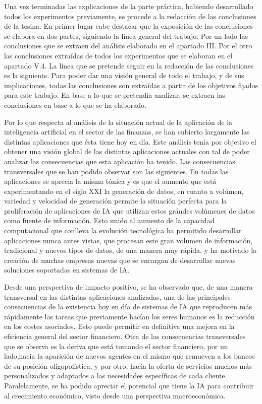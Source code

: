 \documentclass[]{DissertateUSU}
\begin{document}
\noindent Una vez terminadas las explicaciones de la parte práctica,
habiendo desarrollado todos los experimentos previamente, se procede a
la redacción de las conclusiones de la tesina. En primer lugar cabe
destacar que la exposición de las conclusiones se elabora en dos partes,
siguiendo la línea general del trabajo. Por un lado las conclusiones que
se extraen del análisis elaborado en el apartado III. Por el otro las
conclusiones extraídas de todos los experimentos que se elaboran en el
apartado V.4. La línea que se pretende seguir en la redacción de las
conclusiones es la siguiente. Para poder dar una visión general de todo
el trabajo, y de sus implicaciones, todas las conclusiones son extraídas
a partir de los objetivos fijados para este trabajo. En base a lo que se
pretendía analizar, se extraen las conclusiones en base a lo que se ha
elaborado.

\noindent Por lo que respecta al análisis de la situación actual de la
aplicación de la inteligencia artificial en el sector de las finanzas,
se han cubierto largamente las distintas aplicaciones que ésta tiene hoy
en día. Este análisis tenía por objetivo el obtener una visión global de
las distintas aplicaciones actuales con tal de poder analizar las
consecuencias que esta aplicación ha tenido. Las consecuencias
transversales que se han podido observar son las siguientes. En todas
las aplicaciones se aprecia la misma tónica y es que el aumento que está
experimentando en el siglo XXI la generación de datos, en cuanto a
volúmen, variedad y velocidad de generación permite la situación
perfecta para la proliferación de aplicaciones de IA que utilizan estos
grándes volúmenes de datos como fuente de información. Esto unido al
aumento de la capacidad computacional que conlleva la evolución
tecnológica ha permitido desarrollar aplicaciones nunca antes vistas,
que procesan este gran volumen de información, tradicional y nuevos
tipos de datos, de una manera muy rápida, y ha motivado la creación de
muchas empresas nuevas que se encargan de desarrollar nuevas soluciones
soportadas en sistemas de IA.

\noindent Desde una perspectiva de impacto positivo, se ha observado
que, de una manera transversal en las distintas aplicaciones analizadas,
una de las principales consecuencias de la existencia hoy en día de
sistemas de IA que reproducen más rápidamente las tareas que previamente
hacían los seres humanos es la reducción en los costes asociados. Esto
puede permitir en definitiva una mejora en la eficiencia general del
sector financiero. Otra de las consecuencias transversales que se
observa es la deriva que está tomando el sector financiero, por un
lado,hacia la aparición de nuevos agentes en el mismo que remueven a los
bancos de su posición oligopolística, y por otro, hacia la oferta de
servicios muchos más personalizados y adaptados a las necesidades
específicas de cada cliente. Paralelamente, se ha podido apreciar el
potencial que tiene la IA para contribuir al crecimiento económico,
visto desde una perspectiva macroeconómica.
\end{document}
